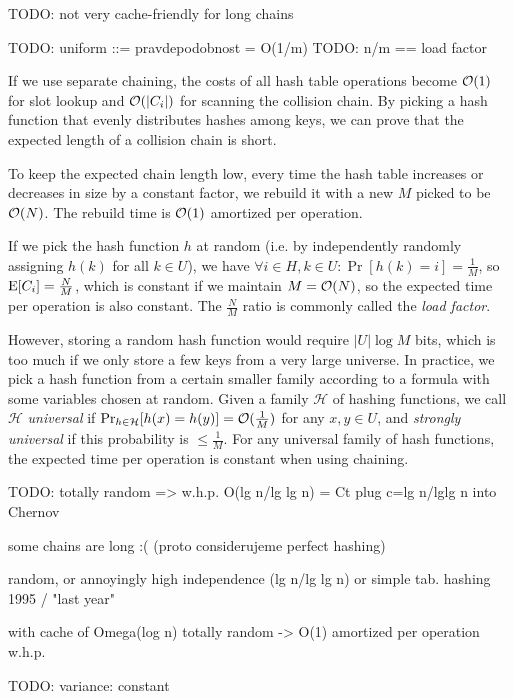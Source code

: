 TODO: not very cache-friendly for long chains

TODO: uniform ::= pravdepodobnost = O(1/m)
TODO: n/m == load factor

If we use separate chaining, the costs of all hash table operations become
$\mathcal{O}(1)$ for slot lookup and $\mathcal{O}(|C_i|)$ for scanning the collision chain.
By picking a hash function that evenly distributes hashes among keys,
we can prove that the expected length of a collision chain is short.

To keep the expected chain length low, every time the hash table increases
or decreases in size by a constant factor, we rebuild it with a new $M$
picked to be $\mathcal{O}(N)$. The rebuild time is $\mathcal{O}(1)$ amortized per operation.

If we pick the hash function $h$ at random (i.e. by independently randomly
assigning $h(k)$ for all $k\in U$), we have $\forall i\in H, k\in U:
\Pr[h(k)=i]=\frac{1}{M}$, so $\mathrm{E}[C_i]=\frac{N}{M}$, which is constant if we
maintain $M=\mathcal{O}(N)$, so the expected time per operation is also constant.
The $\frac{N}{M}$ ratio is commonly called the \emph{load factor}.

However, storing a random hash function would require $|U| \log M$ bits, which
is too much if we only store a few keys from a very large universe. In practice,
we pick a hash function from a certain smaller family according to a formula
with some variables chosen at random.
Given a family $\mathcal{H}$ of hashing functions, we call $\mathcal{H}$
\emph{universal} if $\Pr_{h\in \mathcal{H}}[h(x)=h(y)]=\mathcal{O}(\frac{1}{M})$ for any
$x, y\in U$, and \emph{strongly universal} if this probability is
$\leq\frac{1}{M}$. %
For any universal family of hash functions, the expected time per operation
is constant when using chaining.

TODO: totally random => w.h.p. O(lg n/lg lg n) = Ct
	plug c=lg n/lglg n into Chernov

	some chains are long :(
	(proto considerujeme perfect hashing)

	random, or annoyingly high independence (lg n/lg lg n) or simple tab. hashing
		1995 / "last year"

with cache of Omega(log n) totally random -> O(1) amortized per operation w.h.p.

TODO: variance: constant


